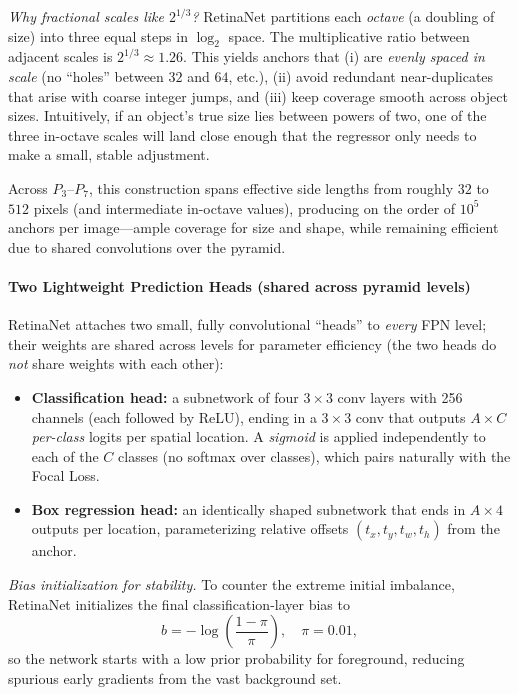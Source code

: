 \emph{Why fractional scales like \(2^{1/3}\)?} RetinaNet partitions each \emph{octave} (a doubling of size) into three equal steps in \(\log_2\) space. The multiplicative ratio between adjacent scales is \(2^{1/3}\approx 1.26\). This yields anchors that (i) are \emph{evenly spaced in scale} (no “holes” between \(32\) and \(64\), etc.), (ii) avoid redundant near-duplicates that arise with coarse integer jumps, and (iii) keep coverage smooth across object sizes. Intuitively, if an object’s true size lies between powers of two, one of the three in-octave scales will land close enough that the regressor only needs to make a small, stable adjustment.

Across \(P_3\)–\(P_7\), this construction spans effective side lengths from roughly \(32\) to \(512\) pixels (and intermediate in-octave values), producing on the order of \(10^5\) anchors per image—ample coverage for size and shape, while remaining efficient due to shared convolutions over the pyramid.

\paragraph{Two Lightweight Prediction Heads (shared across pyramid levels)}
RetinaNet attaches two small, fully convolutional ``heads'' to \emph{every} FPN level; their weights are shared across levels for parameter efficiency (the two heads do \emph{not} share weights with each other):
\begin{itemize}
	\item \textbf{Classification head:} a subnetwork of four \(3\times 3\) conv layers with 256 channels (each followed by ReLU), ending in a \(3\times 3\) conv that outputs \(A\times C\) \emph{per-class} logits per spatial location. A \emph{sigmoid} is applied independently to each of the \(C\) classes (no softmax over classes), which pairs naturally with the Focal Loss.
	\item \textbf{Box regression head:} an identically shaped subnetwork that ends in \(A\times 4\) outputs per location, parameterizing relative offsets \((t_x,t_y,t_w,t_h)\) from the anchor.
\end{itemize}
\emph{Bias initialization for stability.} To counter the extreme initial imbalance, RetinaNet initializes the final classification-layer bias to
\[
b=-\log\!\left(\frac{1-\pi}{\pi}\right),\quad \pi=0.01,
\]
so the network starts with a low prior probability for foreground, reducing spurious early gradients from the vast background set.

